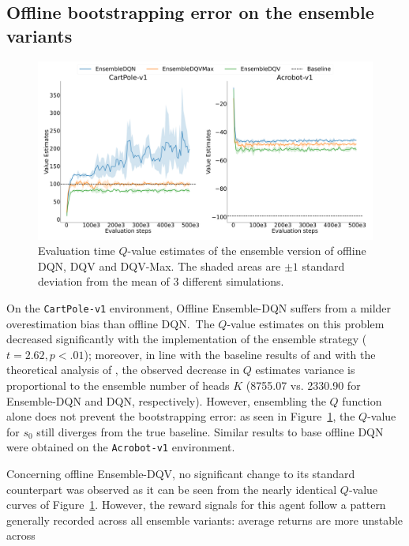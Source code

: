 \subsection{Offline bootstrapping error on the ensemble variants}
\begin{figure}[!tbp]
  \centering
  \includegraphics[width=.5\textwidth]{img/dshift_plots_ensembles_qv.png}
  \caption{Evaluation time $Q$-value estimates of the ensemble version
    of offline DQN, DQV and DQV-Max. The shaded areas are $\pm 1$
    standard deviation from the mean of 3 different
    simulations.}\label{fig:dshift_offline_ensemble}
\end{figure}
On the \texttt{CartPole-v1} environment, Offline Ensemble-DQN suffers
from a milder overestimation bias than offline DQN.\ The $Q$-value
estimates on this problem decreased significantly with the
implementation of the ensemble strategy ($t=2.62,p<.01$); moreover, in
line with the baseline results of \citet{agarwal2020optimistic} and
with the theoretical analysis of \citet{anschel2017averaged}, the
observed decrease in $Q$ estimates variance is proportional to the
ensemble number of heads $K$ (8755.07 vs. 2330.90 for Ensemble-DQN and
DQN, respectively). However, ensembling the $Q$ function alone
does not prevent the bootstrapping error: as seen in
Figure~\ref{fig:dshift_offline_ensemble}, the $Q$-value for $s_0$
still diverges from the true baseline. Similar results to base offline
DQN were obtained on the \texttt{Acrobot-v1} environment.




Concerning offline Ensemble-DQV, no significant change to its standard
counterpart was observed as it can be seen from the nearly identical
$Q$-value curves of Figure~\ref{fig:dshift_offline_ensemble}. However,
the reward signals for this agent follow a pattern generally recorded
across all ensemble variants: average returns are more unstable across

